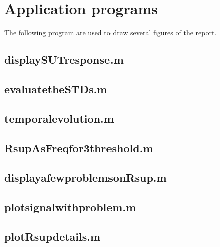 {{{{{ \clearpage
\section{Application programs}
The following program are used to draw several figures of the report.

\subsection{displaySUTresponse.m}
\label{ss:displaySUTresponse}
{\tiny }

  \clearpage
\subsection{evaluatetheSTDs.m}
\label{ss:evaluatetheSTDs}
{\tiny }

 \clearpage
\subsection{temporalevolution.m}
\label{ss:temporalevolution}
{\tiny }

 \clearpage
\subsection{RsupAsFreqfor3threshold.m}
\label{ss:RsupAsFreqfor3threshold}
{\tiny }

 \clearpage
\subsection{displayafewproblemsonRsup.m}
\label{ss:displayafewproblemsonRsup}
{\tiny }

 \clearpage
\subsection{plotsignalwithproblem.m}
\label{ss:plotsignalwithproblem}
{\tiny }

 \clearpage
\subsection{plotRsupdetails.m}
\label{ss:plotRsupdetails}
{\tiny }


}}}}}
